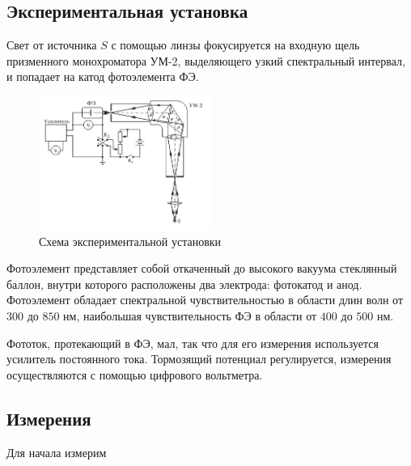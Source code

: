 \subsection*{Экспериментальная установка}


Свет от источника $S$ с помощью линзы фокусируется на входную щель призменного монохроматора УМ-2, выделяющего узкий спектральный интервал, и попадает на катод фотоэлемента ФЭ.
\begin{figure}[h]
    \centering
    \includegraphics[width=0.5\textwidth]{imgs/exp.png}
    \caption{Схема экспериментальной установки}
    \label{fig:exp}
\end{figure}
Фотоэлемент представляет собой откаченный до высокого вакуума стеклянный баллон, внутри которого расположены два электрода: фотокатод и анод. Фотоэлемент обладает спектральной чувствительностью в области длин волн от $300$ до $850$ нм, наибольшая чувствительность ФЭ в области от $400$ до $500$ нм. 

Фототок, протекающий в ФЭ, мал, так что для его измерения используется усилитель постоянного тока. Тормозящий потенциал регулируется, измерения осуществляются с помощью цифрового вольтметра.




\subsection*{Измерения}

Для начала измерим 
